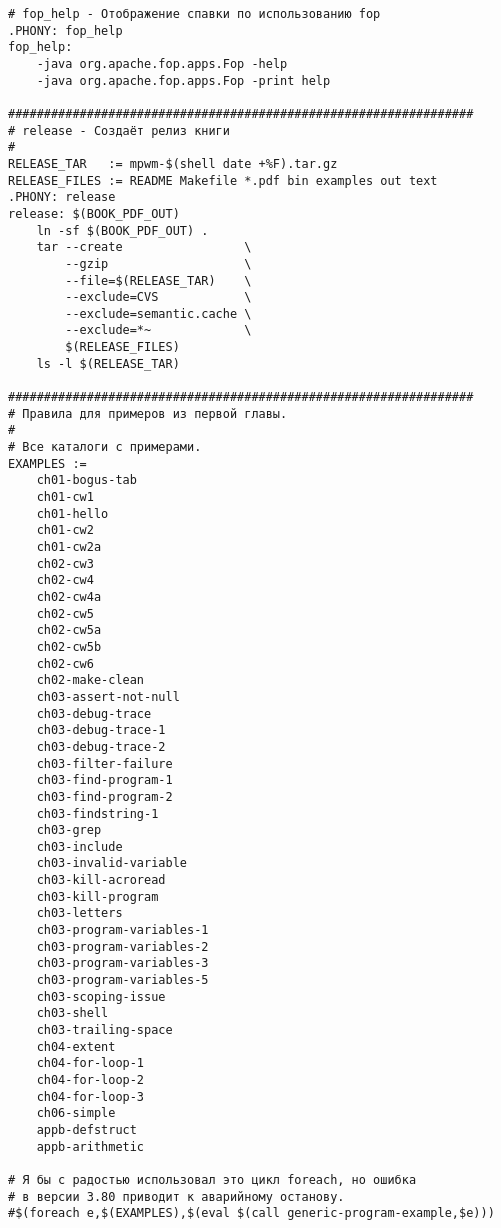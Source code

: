 {\begin{verbatim}
# fop_help - Отображение спавки по использованию fop
.PHONY: fop_help
fop_help:
    -java org.apache.fop.apps.Fop -help
    -java org.apache.fop.apps.Fop -print help

#################################################################
# release - Создаёт релиз книги
#
RELEASE_TAR   := mpwm-$(shell date +%F).tar.gz
RELEASE_FILES := README Makefile *.pdf bin examples out text
.PHONY: release
release: $(BOOK_PDF_OUT)
    ln -sf $(BOOK_PDF_OUT) .
    tar --create                 \
        --gzip                   \
        --file=$(RELEASE_TAR)    \
        --exclude=CVS            \
        --exclude=semantic.cache \
        --exclude=*~             \
        $(RELEASE_FILES)
    ls -l $(RELEASE_TAR)

#################################################################
# Правила для примеров из первой главы.
#
# Все каталоги с примерами.
EXAMPLES :=
    ch01-bogus-tab
    ch01-cw1
    ch01-hello
    ch01-cw2
    ch01-cw2a
    ch02-cw3
    ch02-cw4
    ch02-cw4a
    ch02-cw5
    ch02-cw5a
    ch02-cw5b
    ch02-cw6
    ch02-make-clean
    ch03-assert-not-null
    ch03-debug-trace
    ch03-debug-trace-1
    ch03-debug-trace-2
    ch03-filter-failure
    ch03-find-program-1
    ch03-find-program-2
    ch03-findstring-1
    ch03-grep
    ch03-include
    ch03-invalid-variable
    ch03-kill-acroread
    ch03-kill-program
    ch03-letters
    ch03-program-variables-1
    ch03-program-variables-2
    ch03-program-variables-3
    ch03-program-variables-5
    ch03-scoping-issue
    ch03-shell
    ch03-trailing-space
    ch04-extent
    ch04-for-loop-1
    ch04-for-loop-2
    ch04-for-loop-3
    ch06-simple
    appb-defstruct
    appb-arithmetic

# Я бы с радостью использовал это цикл foreach, но ошибка
# в версии 3.80 приводит к аварийному останову.
#$(foreach e,$(EXAMPLES),$(eval $(call generic-program-example,$e)))


\end{verbatim}}
